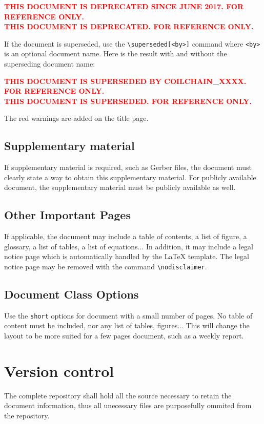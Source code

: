 \documentclass[technicalreport]{coilchain}
\begin{document}
\textcolor{red}{\textbf{THIS DOCUMENT IS DEPRECATED SINCE JUNE 2017. FOR 
REFERENCE ONLY.}}\\
\textcolor{red}{\textbf{THIS DOCUMENT IS DEPRECATED. FOR REFERENCE ONLY.}}

If the document is superseded, use the \verb|\superseded[<by>]| command where 
\verb|<by>| is an optional document name. Here is the result with and 
without the superseding document name:

\textcolor{red}{\textbf{THIS DOCUMENT IS SUPERSEDED BY COILCHAIN\_XXXX. FOR 
		REFERENCE ONLY.}}\\
\textcolor{red}{\textbf{THIS DOCUMENT IS SUPERSEDED. FOR REFERENCE ONLY.}}

The red warnings are added on the title page.

\subsection{Supplementary material}
If supplementary material is required, such as Gerber files, the document must 
clearly state a way to obtain this supplementary material. For publicly 
available document, the supplementary material must be publicly available as 
well.


\subsection{Other Important Pages}
If applicable, the document may include a table of contents, a list of figure, 
a glossary, a list of tables, a list of equations... In addition, it may
include a legal notice page which is automatically handled by the \LaTeX{}
template. The legal notice page may be removed with the command 
\verb|\nodisclaimer|.

\subsection{Document Class Options}
Use the \verb|short| options for document with a small number of pages. No 
table of content must be included, nor any list of tables, figures... This will 
change the layout to be more suited for a few pages document, such as a weekly 
report.


\section{Version control}
The complete repository shall hold all the source necessary to retain the document information, thus all unecessary files are purposefully ommited from the repository.
\end{document}
